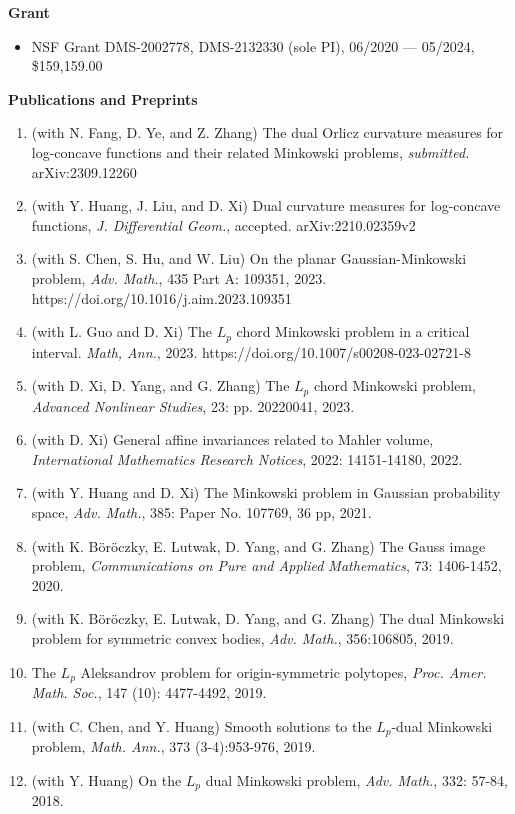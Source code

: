 \documentclass[12pt]{article}
\theoremstyle{plain} \numberwithin{equation}{section}
\theoremstyle{definition}
\begin{document}
{\large\textbf{Grant}}

\begin{itemize}
	\item NSF Grant DMS-2002778, DMS-2132330 (sole PI), 06/2020 --- 05/2024, \$159,159.00 
\end{itemize}


{\large\textbf{Publications and Preprints}}

\begin{enumerate}
\item (with N. Fang, D. Ye, and Z. Zhang) The dual Orlicz curvature measures for log-concave functions and their related Minkowski problems, \emph{submitted.} arXiv:2309.12260
\item (with Y. Huang, J. Liu, and D. Xi) Dual curvature measures for log-concave functions, \emph{J. Differential Geom.}, accepted. arXiv:2210.02359v2
\item (with S. Chen, S. Hu, and W. Liu) On the planar Gaussian-Minkowski problem, \emph{Adv. Math.}, 435 Part A: 109351, 2023.\\ https://doi.org/10.1016/j.aim.2023.109351
\item (with L. Guo and D. Xi) The $L_p$ chord Minkowski problem in a critical interval. \emph{Math, Ann.}, 2023. https://doi.org/10.1007/s00208-023-02721-8
\item (with D. Xi, D. Yang, and G. Zhang) The $L_p$ chord Minkowski problem, \emph{Advanced Nonlinear Studies}, 23: pp. 20220041, 2023.
\item (with D. Xi) General affine invariances related to Mahler volume, \textit{International Mathematics Research Notices}, 2022: 14151-14180, 2022. 
\item (with Y. Huang and D. Xi) The Minkowski problem in Gaussian probability space, \textit{Adv. Math.}, 385: Paper No. 107769, 36 pp, 2021.
\item (with K. B\"{o}r\"{o}czky, E. Lutwak, D. Yang, and G. Zhang) The Gauss image problem, \textit{Communications on Pure and Applied Mathematics}, 73: 1406-1452, 2020.
\item (with K. B\"{o}r\"{o}czky, E. Lutwak, D. Yang, and G. Zhang) The dual Minkowski problem for symmetric convex bodies, \textit{Adv. Math.}, 356:106805, 2019.
\item The $L_p$ Aleksandrov problem for origin-symmetric polytopes, \textit{Proc. Amer. Math. Soc.}, 147 (10): 4477-4492, 2019.
\item (with C. Chen, and Y. Huang) Smooth solutions to the $L_p$-dual Minkowski problem, \textit{Math. Ann.}, 373 (3-4):953-976, 2019.
\item (with Y. Huang) On the $L_p$ dual Minkowski problem, \textit{Adv. Math.}, 332: 57-84, 2018.
 

\end{enumerate}
\end{document}
